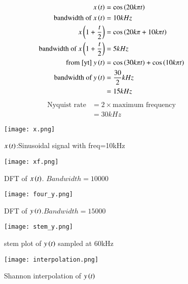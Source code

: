 \documentclass[journal,12pt,twocolumn]{IEEEtran}
\begin{document}
\begin{align}
  x\left(t\right)&=\cos{\ensuremath{\left(20k\pi t\right)}}\\
    \text{bandwidth of } x\left(t\right) &= 10 kHz\\
    x\left(1+\frac{t}{2}\right) &= \cos{\ensuremath{\left(20k\pi+10k\pi t\right)}}\\
    \text{bandwidth of } x\left(1+\frac{t}{2}\right) &=  5 kHz\\
    \text{from \eqref{yt} } 
    y\left(t\right)&= \cos{\ensuremath{\left(30k\pi t\right)}}+\cos{\ensuremath{\left(10k\pi t\right)}}\\
    \text{bandwidth of } y\left(t\right) &= \frac{30}{2} kHz\\
    &= 15 kHz
\end{align}
\begin{align}
    \text{Nyquist rate} &= 2 \times \text{maximum frequency}\\
    &= 30 kHz
\end{align}
\begin{figure}[!h]
 \centering
 \texttt{[image: x.png]}
 \caption{$x\left(t\right)$:Sinusoidal signal with freq=10kHz}
\end{figure}
\begin{figure}[!h]
 \centering
 \texttt{[image: xf.png]}
 \caption{DFT of $x\left(t\right)$. $Bandwidth=10000$}
\end{figure}
\begin{figure}[!h]
 \centering
 \texttt{[image: four\_y.png]}
 \caption{DFT of $y\left(t\right)$.$Bandwidth=15000$}
\end{figure}
\begin{figure}[!h]
 \centering
 \texttt{[image: stem\_y.png]}
 \caption{stem plot of $y\left(t\right)$ sampled at 60kHz}
\end{figure}
\begin{figure}[!h]
 \centering
 \texttt{[image: interpolation.png]}
 \caption{Shannon interpolation of $y\left(t\right)$}
\end{figure}
\end{document}

